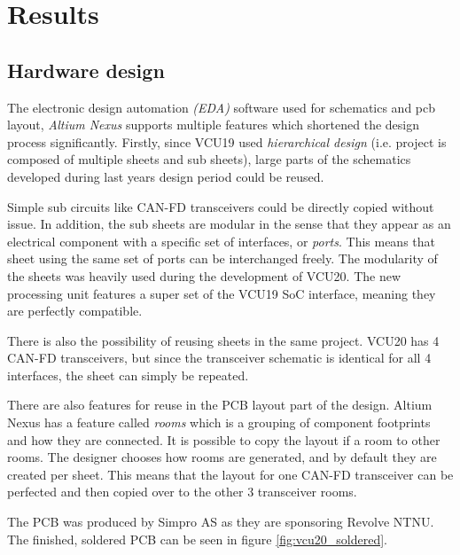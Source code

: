 \section{Results}

\subsection{Hardware design}



The electronic design automation \emph{(EDA)} software used for schematics and pcb layout, \emph{Altium Nexus} supports multiple features which shortened the design process significantly. Firstly, since VCU19 used \emph{hierarchical design} (i.e. project is composed of multiple sheets and sub sheets), large parts of the schematics developed during last years design period could be reused. 

Simple sub circuits like CAN-FD transceivers could be directly copied without issue. In addition, the sub sheets are modular in the sense that they appear as an electrical component with a specific set of interfaces, or \emph{ports}. This means that sheet using the same set of ports can be interchanged freely. The modularity of the sheets was heavily used during the development of VCU20. The new processing unit features a super set of the VCU19 SoC interface, meaning they are perfectly compatible. 

There is also the possibility of reusing sheets in the same project. VCU20 has 4 CAN-FD transceivers, but since the transceiver schematic is identical for all 4 interfaces, the sheet can simply be repeated. 

There are also features for reuse in the PCB layout part of the design. Altium Nexus has a feature called \emph{rooms} which is a grouping of component footprints and how they are connected. It is possible to copy the layout if a room to other rooms. The designer chooses how rooms are generated, and by default they are created per sheet. This means that the layout for one CAN-FD transceiver can be perfected and then copied over to the other 3 transceiver rooms.

The PCB was produced by Simpro AS as they are sponsoring Revolve NTNU. The finished, soldered PCB can be seen in figure \ref{fig:vcu20_soldered}.

